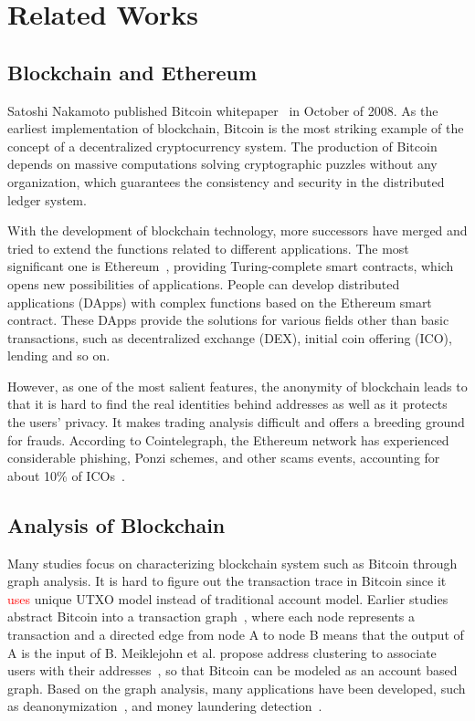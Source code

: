 
\section{Related Works}
\label{sec:relatedworks}
\subsection{Blockchain and Ethereum}
Satoshi Nakamoto published Bitcoin whitepaper~\cite{Nakamoto2008} in October of 2008. As the earliest implementation of blockchain, Bitcoin is the most striking example of the concept of a decentralized cryptocurrency system. The production of Bitcoin depends on massive computations solving cryptographic puzzles without any organization, which guarantees the consistency and security in the distributed ledger system.

With the development of blockchain technology, more successors have merged and tried to extend the functions related to different applications. The most significant one is Ethereum~\cite{buterin2013ethereum}, providing Turing-complete smart contracts, which opens new possibilities of applications. People can develop distributed applications (DApps) with complex functions based on the Ethereum smart contract. These DApps provide the solutions for various fields other than basic transactions, such as decentralized exchange (DEX), initial coin offering (ICO), lending and so on.

However, as one of the most salient features, the anonymity of blockchain leads to that it is hard to find the real identities behind addresses as well as it protects the users' privacy. It makes trading analysis difficult and offers a breeding ground for frauds. According to Cointelegraph, the Ethereum network has experienced considerable phishing, Ponzi schemes, and other scams events, accounting for about 10\% of ICOs~\cite{cerchiello2018icos}.
\subsection{Analysis of Blockchain}
Many studies focus on characterizing blockchain system such as Bitcoin through graph analysis. It is hard to figure out the transaction trace in Bitcoin since it \textcolor{red}{uses} unique UTXO model instead of traditional account model. Earlier studies abstract Bitcoin into a transaction graph~\cite{reid2013analysis}, where each node represents a transaction and a directed edge from node A to node B means that the output of A is the input of B. Meiklejohn et al. propose address clustering to associate users with their addresses~\cite{meiklejohn2013fistful}, so that Bitcoin can be modeled as an account based graph. Based on the graph analysis, many applications have been developed, such as deanonymization~\cite{reid2013analysis}, and money laundering detection~\cite{zhao2015graph,maesa2016analysis,ranshous2017exchange}. 

